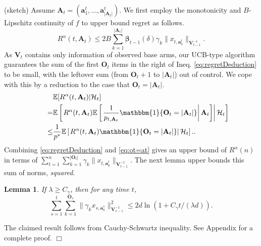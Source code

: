 \documentclass{article}
\newcommand{\bbeta}{\boldsymbol{\beta}}
\newcommand{\EE}{\mathbb{E}}
\newcommand{\bOne}{\mathbbm{1}}
\newcommand{\bA}{\mathbf{A}}
\newcommand{\ba}{\mathbf{a}}
\newcommand{\bO}{\mathbf{O}}
\newcommand{\bV}{\mathbf{V}}
\newcommand{\cH}{\mathcal{H}}
\newcommand{\abs}[1]{\left| #1 \right|}
\newcommand{\norm}[1]{\| #1 \|}
\newtheorem{lemma}[theorem]{Lemma}%
\newenvironment{proof}{\noindent {\textbf{Proof. }}}{$\Box$ \medskip}
\begin{document}
\begin{proof}%
	(sketch) %
	Assume $\bA_t = (\ba_1^t, \ldots, \ba_{|\bA_t|}^t)$. We first employ the monotonicity and $B$-Lipschitz continuity of $f$ to upper bound regret as follows.
	\begin{equation}
		\label{eq:regretDeduction}
		R^{\alpha}(t, \bA_t) \leq 2B \sum_{k=1}^{|\bA_t|} \bbeta_{t-1}(\delta) \gamma_k \| x_{t, \ba_k^t} \|_{\bV_{t-1}^{-1}}.
	\end{equation}
	As $\bV_t$ contains only information of observed base arms, our UCB-type algorithm guarantees the sum of the first $\bO_t$ items in the right of Ineq. \ref{eq:regretDeduction} to be small, with the leftover sum (from $\bO_t + 1$ to $|\bA_t|$) out of control. We cope with this by a reduction to the case that $\bO_t = |\bA_t|$.
	\begin{align}
    	&\EE[R^{\alpha}(t, \bA_t)|\cH_t] \nonumber\\
    	\qquad = &\EE \left[ \left. R^{\alpha}(t, \bA_t) \EE \left[ \left. \frac{1}{p_{t, \bA_t}} \bOne\{\bO_t = \abs{\bA_t}\} \right| \bA_t \right]  \right| \cH_t \right]\nonumber\\
    	\qquad \leq & \frac{1}{p^*} \EE \left[ \left. R^{\alpha}(t, \bA_t) \bOne\{\bO_t = \abs{\bA_t}\} \right| \cH_t \right]. \label{eq:ot=at}.
    \end{align}
    Combining \ref{eq:regretDeduction} and \ref{eq:ot=at} gives an upper bound of $R^{\alpha}(n)$ in terms of $\sum_{t=1}^n \sum_{k=1}^{\abs{\bO_t}} \gamma_k\norm{ x_{t, \ba_k^t} }_{ \bV_{t-1}^{-1} }$. The next lemma upper bounds this sum of norms, \emph{squared}.
    \begin{lemma}
    	\label{lem:XNormSumEst}
    	If $\lambda \geq C_{\gamma}$, then for any time $t$,
    	$$
    	\sum_{s=1}^t \sum_{k=1}^{\bO_s} \norm{\gamma_k x_{s,\ba_{k}^s}}_{\bV_{s-1}^{-1}}^2 \leq 2d\ln \left(1 + C_{\gamma}t/(\lambda d)\right).
    	$$
    \end{lemma}
    The claimed result follows from Cauchy-Schwartz inequality. See Appendix for a complete proof.
\end{proof}
\end{document}
